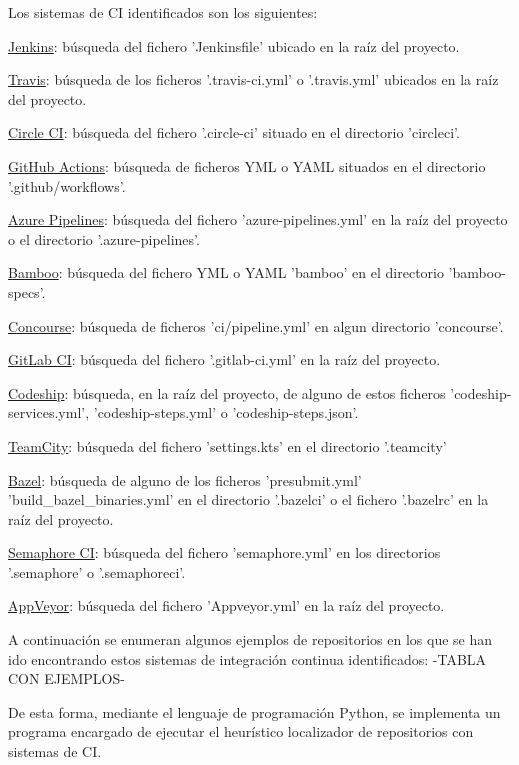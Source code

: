 Los sistemas de CI identificados son los siguientes:
\begin{compactitem}
    \item \underline{Jenkins}: búsqueda del fichero 'Jenkinsfile' ubicado en la raíz del proyecto.
    \item \underline{Travis}: búsqueda de los ficheros '.travis-ci.yml' o '.travis.yml' ubicados en la raíz del proyecto.
    \item \underline{Circle CI}: búsqueda del fichero '.circle-ci' situado en el directorio 'circleci'.
    \item \underline{GitHub Actions}: búsqueda de ficheros YML o YAML situados en el directorio '.github/workflows'.
    \item \underline{Azure Pipelines}: búsqueda del fichero 'azure-pipelines.yml' en la raíz del proyecto o el directorio '.azure-pipelines'.
    \item \underline{Bamboo}: búsqueda del fichero YML o YAML 'bamboo' en el directorio 'bamboo-specs'.
    \item \underline{Concourse}: búsqueda de ficheros 'ci/pipeline.yml' en algun directorio 'concourse'.
    \item \underline{GitLab CI}: búsqueda del fichero '.gitlab-ci.yml' en la raíz del proyecto.
    \item \underline{Codeship}: búsqueda, en la raíz del proyecto, de alguno de estos ficheros 'codeship-services.yml', 'codeship-steps.yml' o 'codeship-steps.json'.
    \item \underline{TeamCity}: búsqueda del fichero 'settings.kts' en el directorio '.teamcity'
    \item \underline{Bazel}: búsqueda de alguno de los ficheros 'presubmit.yml' 'build\_bazel\_binaries.yml' en el directorio '.bazelci' o el fichero '.bazelrc' en la raíz del proyecto.
    \item \underline{Semaphore CI}: búsqueda del fichero 'semaphore.yml' en los directorios '.semaphore' o '.semaphoreci'.
    \item \underline{AppVeyor}: búsqueda del fichero 'Appveyor.yml' en la raíz del proyecto.
\end{compactitem}

A continuación se enumeran algunos ejemplos de repositorios en los que se han ido encontrando estos sistemas de integración continua identificados:
-TABLA CON EJEMPLOS-
	
De esta forma, mediante el lenguaje de programación Python, se implementa un programa encargado de ejecutar el heurístico localizador de repositorios con sistemas de CI.

